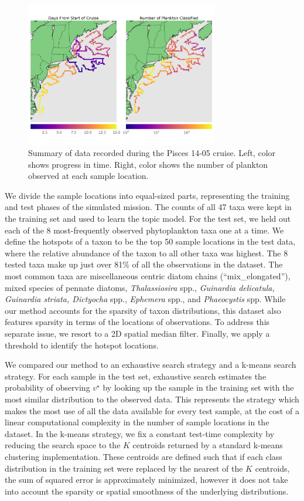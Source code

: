 \begin{figure}
	\centering
	\includegraphics[width=0.75\textwidth]{figures/icra_plankton/n_plankton.png}
	\caption{Summary of data recorded during the Pisces 14-05 cruise. Left, color shows progress in time. Right, color shows the number of plankton observed at each sample location.}
	\label{fig:plankton-pisces-summary-in}
\end{figure}

We divide the sample locations into equal-sized parts, representing the training and test phases of the simulated mission. The counts of all 47 taxa were kept in the training set and used to learn the topic model. For the test set, we held out each of the 8 most-frequently observed phytoplankton taxa one at a time. We define the hotspots of
a taxon to be the top 50 sample locations in the test data, where the relative abundance of the taxon to all other taxa was highest. The 8 tested taxa make up just over 81\% of all the observations in the dataset. The most common taxa are miscellaneous centric diatom chains (``mix\_elongated''), mixed species of pennate diatoms, \emph{Thalassiosira} spp., \emph{Guinardia delicatula, Guinardia striata, Dictyocha} spp., \emph{Ephemera} spp., and \emph{Phaeocystis} spp. While our method accounts for the sparsity of taxon distributions, this dataset also features sparsity in terms of the locations of observations. To address this separate issue, we resort to a 2D spatial median filter. Finally, we apply a threshold to identify the hotspot locations.

We compared our method to an exhaustive search strategy and a k-means search strategy. For each sample in the test set, exhaustive search estimates the probability of observing $v^\star$ by looking up the sample in the training set with the most similar distribution to the observed data. This represents the strategy which makes the most use of all the data available for every test sample, at the cost of a linear computational complexity in the number of sample locations in the dataset. In the k-means strategy, we fix a constant test-time complexity by reducing the search space to the $K$ centroids returned by a standard k-means clustering implementation. These centroids are defined such that if each class distribution in the training set were replaced by the nearest of the $K$ centroids, the sum of squared error is approximately minimized, however it does not take into account the sparsity or spatial smoothness of the underlying distributions.

